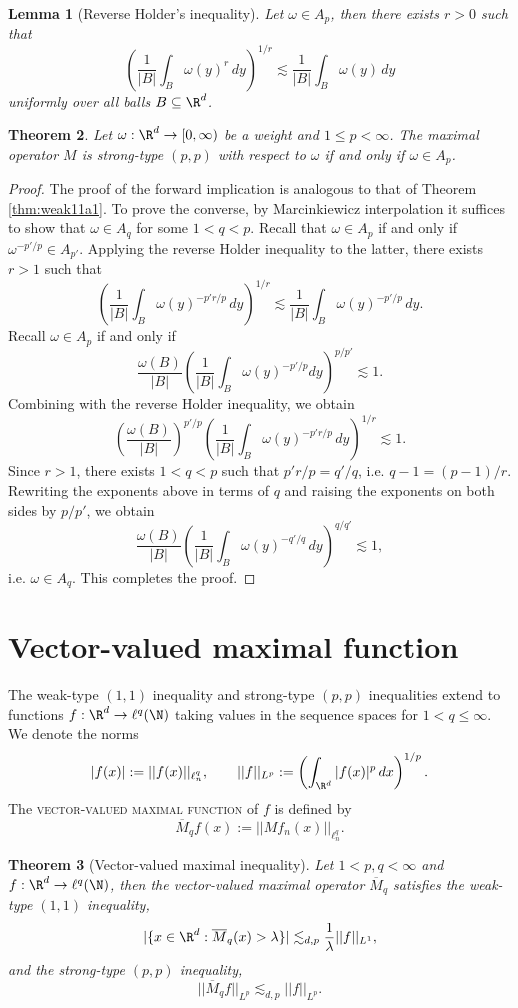 \documentclass[reqno]{amsart}
\newtheorem{theorem}{Theorem}
\newtheorem{lemma}[theorem]{Lemma}
\theoremstyle{definition}
\theoremstyle{remark}
\renewcommand{\emph}{\textsc}
\begin{document}
\begin{lemma}[Reverse Holder's inequality]
	Let $\omega \in A_p$, then there exists $r > 0$ such that 
		\[ \left( \frac{1}{|B|} \int_B \omega(y)^r \, dy \right)^{1/r} \lesssim \frac{1}{|B|} \int_B \omega(y) \, dy \]
	uniformly over all balls $B \subseteq \R^d$. 	
\end{lemma}

\begin{theorem}
	Let $\omega : \R^d \to [0, \infty)$ be a weight and $1 \leq p < \infty$. The maximal operator $M$ is strong-type $(p, p)$ with respect to $\omega$ if and only if $\omega \in A_p$. 
\end{theorem}

\begin{proof}
	The proof of the forward implication is analogous to that of Theorem \ref{thm:weak11a1}. To prove the converse, by Marcinkiewicz interpolation it suffices to show that $\omega \in A_q$ for some $1 < q < p$. Recall that $\omega \in A_p$ if and only if $\omega^{-p'/p} \in A_{p'}$. Applying the reverse Holder inequality to the latter, there exists $r > 1$ such that 
		\[ \left( \frac{1}{|B|} \int_B \omega(y)^{-p' r/p} \, dy \right)^{1/r} \lesssim \frac{1}{|B|} \int_B \omega(y)^{-p'/p} \, dy. \]
	Recall $\omega \in A_p$ if and only if 
		\[ \frac{\omega(B)}{|B|} \left( \frac{1}{|B|} \int_B \omega(y)^{-p'/p} dy \right)^{p/p'} \lesssim 1. \]
	Combining with the reverse Holder inequality, we obtain	
		\[ \left( \frac{\omega(B)}{|B|} \right)^{p'/p} \left( \frac{1}{|B|} \int_B \omega(y)^{-p' r/p} \, dy \right)^{1/r} \lesssim 1. \]
	Since $r > 1$, there exists $1 < q < p$ such that $p' r/p = q'/q$, i.e. $q - 1 = (p - 1)/r$. Rewriting the exponents above in terms of $q$ and raising the exponents on both sides by $p/p'$, we obtain
		\[ \frac{\omega(B)}{|B|}  \left( \frac{1}{|B|} \int_B \omega(y)^{-q'/q} \, dy \right)^{q/q'} \lesssim 1, \]
	i.e. $\omega \in A_q$. This completes the proof. 		
\end{proof}

\section{Vector-valued maximal function}
The weak-type $(1, 1)$ inequality and strong-type $(p, p)$ inequalities extend to functions $f : \R^d \to \ell^q (\N)$ taking values in the sequence spaces for $1 < q \leq \infty$. We denote the norms
	\[ |f (x)| := ||f (x)||_{\ell^q_n}, \qquad ||f||_{L^p} := \left( \int_{\R^d} |f(x)|^p \, dx\right)^{1/p}. \]
The \emph{vector-valued maximal function} of $f$ is defined by	
	\[ \overline M_q f (x) := || Mf_n (x)||_{\ell^q_n}. \]
\begin{theorem}[Vector-valued maximal inequality]
	Let $1 < p, q < \infty$ and $f : \R^d \to \ell^q (\N)$, then the vector-valued maximal operator $\overline M_q$ satisfies the weak-type $(1,1)$ inequality,
		\[ |\{ x \in \R^d : \overline M_q (x) > \lambda \}| \lesssim_{d, p} \frac1\lambda ||f||_{L^1}, \]
	and the strong-type $(p, p)$ inequality,
		\[ ||\overline M_q f||_{L^p} \lesssim_{d, p} ||f||_{L^p}. \]	\label{thm:vectorvalued}
\end{theorem}
\end{document}
